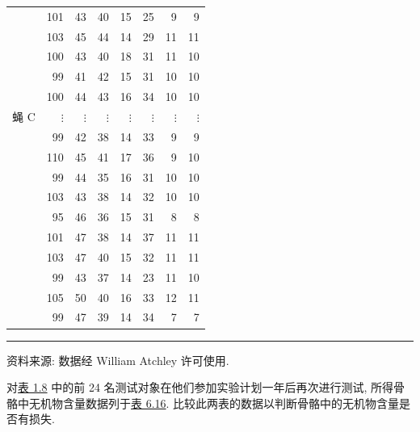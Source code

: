 \begin{mvtable}
{\begin{tabular}{crrrrrrr}
 & 101 & 43 & 40 & 15 & 25 & 9 & 9\\
 & 103 & 45 & 44 & 14 & 29 & 11 & 11\\
 & 100 & 43 & 40 & 18 & 31 & 11 & 10\\
 & 99 & 41 & 42 & 15 & 31 & 10 & 10\\
 & 100 & 44 & 43 & 16 & 34 & 10 & 10\\
蝇 C & $\vdots$ & $\vdots$ & $\vdots$ & $\vdots$ & $\vdots$ & $\vdots$ & $\vdots$\\
 & 99 & 42 & 38 & 14 & 33 & 9 & 9\\
 & 110 & 45 & 41 & 17 & 36 & 9 & 10\\
 & 99 & 44 & 35 & 16 & 31 & 10 & 10\\
 & 103 & 43 & 38 & 14 & 32 & 10 & 10\\
 & 95 & 46 & 36 & 15 & 31 & 8 & 8\\
 & 101 & 47 & 38 & 14 & 37 & 11 & 11\\
 & 103 & 47 & 40 & 15 & 32 & 11 & 11\\
 & 99 & 43 & 37 & 14 & 23 & 11 & 10\\
 & 105 & 50 & 40 & 16 & 33 & 12 & 11\\
 & 99 & 47 & 39 & 14 & 34 & 7 & 7\\
\bottomrule
\end{tabular}
}
\end{mvtable}

\vspace{2pt}
\noindent\rule{\linewidth}{0.4pt}

\noindent\small 资料来源: 数据经 William Atchley 许可使用.

\vspace{1em}
\quad 对\hyperref[tab:1.8]{表 1.8} 中的前 24 名测试对象在他们参加实验计划一年后再次进行测试, 所得骨骼中无机物含量数据列于\hyperref[tab:6.16]{表 6.16}. 比较此两表的数据以判断骨骼中的无机物含量是否有损失.
